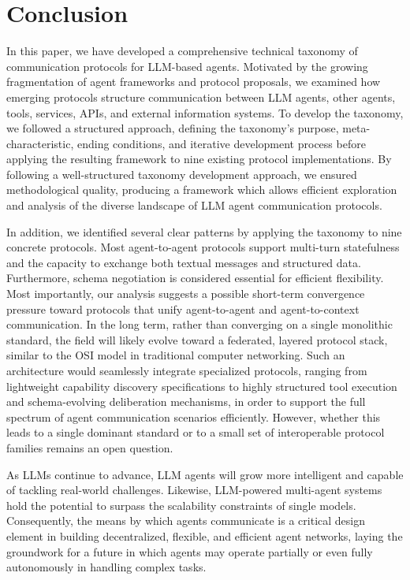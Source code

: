 \documentclass[pdflatex,sn-mathphys-num]{sn-jnl}%
\theoremstyle{thmstyleone}%
\theoremstyle{thmstyletwo}%
\theoremstyle{thmstylethree}%
\begin{document}
\section{Conclusion}\label{conclusion}

In this paper, we have developed a comprehensive technical taxonomy of communication protocols for LLM-based agents. Motivated by the growing fragmentation of agent frameworks and protocol proposals, we examined how emerging protocols structure communication between LLM agents, other agents, tools, services, APIs, and external information systems. To develop the taxonomy, we followed a structured approach, defining the taxonomy's purpose, meta-characteristic, ending conditions, and iterative development process before applying the resulting framework to nine existing protocol implementations. By following a well-structured taxonomy development approach, we ensured methodological quality, producing a framework which allows efficient exploration and analysis of the diverse landscape of LLM agent communication protocols.

In addition, we identified several clear patterns by applying the taxonomy to nine concrete protocols. Most agent-to-agent protocols support multi-turn statefulness and the capacity to exchange both textual messages and structured data. Furthermore, schema negotiation is considered essential for efficient flexibility.
%
Most importantly, our analysis suggests a possible short-term convergence pressure toward protocols that unify agent-to-agent and agent-to-context communication. In the long term, rather than converging on a single monolithic standard, the field will likely evolve toward a federated, layered protocol stack, similar to the OSI model in traditional computer networking. Such an architecture would seamlessly integrate specialized protocols, ranging from lightweight capability discovery specifications to highly structured tool execution and schema-evolving deliberation mechanisms, in order to support the full spectrum of agent communication scenarios efficiently.
%
However, whether this leads to a single dominant standard or to a small set of interoperable protocol families remains an open question.

As LLMs continue to advance, LLM agents will grow more intelligent and capable of tackling real-world challenges. Likewise, LLM-powered multi-agent systems hold the potential to surpass the scalability constraints of single models. Consequently, the means by which agents communicate is a critical design element in building decentralized, flexible, and efficient agent networks, laying the groundwork for a future in which agents may operate partially or even fully autonomously in handling complex tasks.
\end{document}
